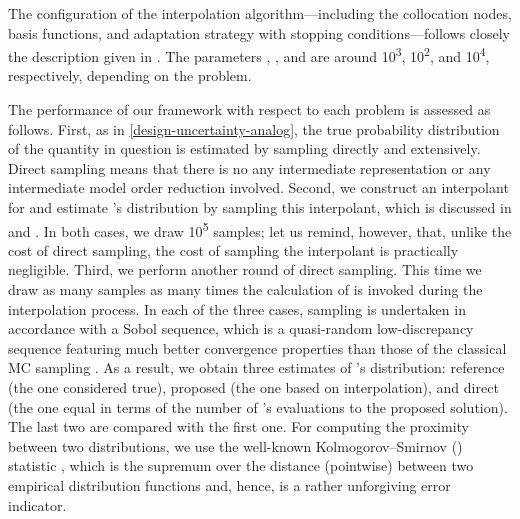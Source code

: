 The configuration of the interpolation algorithm---including the collocation
nodes, basis functions, and adaptation strategy with stopping
conditions---follows closely the description given in
. The parameters , , and
 are around 10\textsuperscript{3}, 10\textsuperscript{2}, and
10\textsuperscript{4}, respectively, depending on the problem.

The performance of our framework with respect to each problem is assessed as
follows. First, as in \cref{design-uncertainty-analog}, the true probability
distribution of the quantity in question \g is estimated by sampling \g directly
and extensively. Direct sampling means that there is no any intermediate
representation or any intermediate model order reduction involved. Second, we
construct an interpolant for \g and estimate \g's distribution by sampling this
interpolant, which is discussed in  and
. In both cases, we draw 10\textsuperscript{5}
samples; let us remind, however, that, unlike the cost of direct sampling, the
cost of sampling the interpolant is practically negligible. Third, we perform
another round of direct sampling. This time we draw as many samples as many
times the calculation of \g is invoked during the interpolation process. In each
of the three cases, sampling is undertaken in accordance with a Sobol sequence,
which is a quasi-random low-discrepancy sequence featuring much better
convergence properties than those of the classical \ac{MC} sampling
\cite{joe2008}. As a result, we obtain three estimates of \g's distribution:
reference (the one considered true), proposed (the one based on interpolation),
and direct (the one equal in terms of the number of \g's evaluations to the
proposed solution). The last two are compared with the first one. For computing
the proximity between two distributions, we use the well-known
Kolmogorov--Smirnov () statistic \cite{rao2002}, which is the supremum
over the distance (pointwise) between two empirical distribution functions and,
hence, is a rather unforgiving error indicator.


